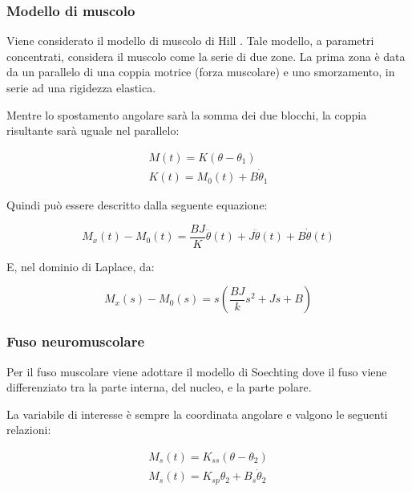 \subsubsection{Modello di muscolo}

Viene considerato il modello di muscolo di Hill \cite{hill_heat_1938}. Tale modello, a parametri concentrati, considera il muscolo come la serie di due zone. La prima zona è data da un parallelo di una coppia motrice (forza muscolare) e uno smorzamento, in serie ad una rigidezza elastica.

Mentre lo spostamento angolare sarà la somma dei due blocchi, la coppia risultante sarà uguale nel parallelo:

\begin{equation}
	\begin{gathered}
		M(t)=K\left(\theta-\theta_{1}\right) \\
		K(t)=M_{0}(t)+B \dot{\theta}_{1}
	\end{gathered}
\end{equation}

Quindi può essere descritto dalla seguente equazione:

\begin{equation}
	M_{x}(t)-M_{0}(t)=\frac{B J}{K} \dddot{\theta}(t)+J \ddot{\theta}(t)+B \dot{\theta}(t)
\end{equation}

E, nel dominio di Laplace, da:

\begin{equation}
	M_{x}(s)-M_{0}(s)=s\left(\frac{B J}{k} s^{2}+J s+B\right)
\end{equation}

\subsubsection{Fuso neuromuscolare}

Per il fuso muscolare viene adottare il modello di Soechting \cite{mains_model_1971} dove il fuso viene differenziato tra la parte interna, del nucleo, e la parte polare.

La variabile di interesse è sempre la coordinata angolare e valgono le seguenti relazioni:

\begin{equation}
	\begin{gathered}
		M_{s}(t)=K_{s s}\left(\theta-\theta_{2}\right) \\
		M_{s}(t)=K_{s p}  \theta_{2}+B_{s} \dot{\theta}_{2}
	\end{gathered}
\end{equation}

